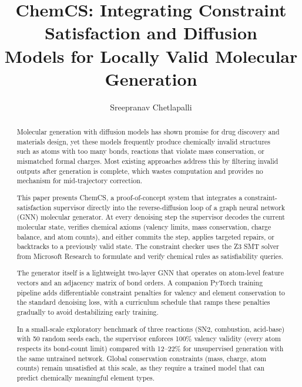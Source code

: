 \documentclass[11pt]{article}
\title{ChemCS: Integrating Constraint Satisfaction and Diffusion\\Models for Locally Valid Molecular Generation}
\author{Sreepranav Chetlapalli}
\date{}
\begin{document}
\maketitle

\begin{abstract}
Molecular generation with diffusion models has shown promise for drug
discovery and materials design, yet these models frequently produce
chemically invalid structures such as atoms with too many bonds,
reactions that violate mass conservation, or mismatched formal charges.
Most existing approaches address this by filtering invalid outputs
after generation is complete, which wastes computation and provides no
mechanism for mid-trajectory correction.

This paper presents ChemCS, a proof-of-concept system that integrates a
constraint-satisfaction supervisor directly into the reverse-diffusion
loop of a graph neural network (GNN) molecular generator. At every
denoising step the supervisor decodes the current molecular state,
verifies chemical axioms (valency limits, mass conservation, charge
balance, and atom counts), and either commits the step, applies targeted
repairs, or backtracks to a previously valid state. The constraint
checker uses the Z3 SMT solver from Microsoft Research to formulate and
verify chemical rules as satisfiability queries.

The generator itself is a lightweight two-layer GNN that operates on
atom-level feature vectors and an adjacency matrix of bond orders. A
companion PyTorch training pipeline adds differentiable constraint
penalties for valency and element conservation to the standard denoising
loss, with a curriculum schedule that ramps these penalties gradually to
avoid destabilizing early training.

In a small-scale exploratory benchmark of three reactions (SN2,
combustion, acid-base) with 50 random seeds each, the supervisor
enforces 100\% valency validity (every atom respects its bond-count
limit) compared with 12--22\% for unsupervised generation with the same
untrained network. Global conservation constraints (mass, charge, atom
counts) remain unsatisfied at this scale, as they require a trained model
that can predict chemically meaningful element types.
\end{abstract}

\end{document}
